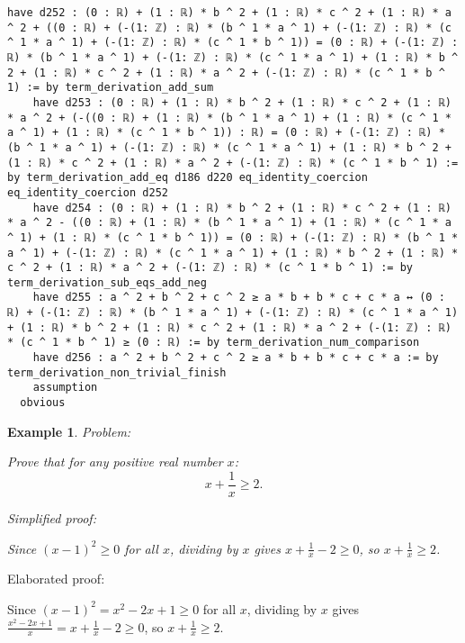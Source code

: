 \documentclass{article}
\newtheorem{example}{Example}
\begin{document}
\begin{tcolorbox}[colback=white!10, width=\linewidth]
\begin{lstlisting}[language=Lean4]
    have d252 : (0 : ℝ) + (1 : ℝ) * b ^ 2 + (1 : ℝ) * c ^ 2 + (1 : ℝ) * a ^ 2 + ((0 : ℝ) + (-(1: ℤ) : ℝ) * (b ^ 1 * a ^ 1) + (-(1: ℤ) : ℝ) * (c ^ 1 * a ^ 1) + (-(1: ℤ) : ℝ) * (c ^ 1 * b ^ 1)) = (0 : ℝ) + (-(1: ℤ) : ℝ) * (b ^ 1 * a ^ 1) + (-(1: ℤ) : ℝ) * (c ^ 1 * a ^ 1) + (1 : ℝ) * b ^ 2 + (1 : ℝ) * c ^ 2 + (1 : ℝ) * a ^ 2 + (-(1: ℤ) : ℝ) * (c ^ 1 * b ^ 1) := by term_derivation_add_sum
    have d253 : (0 : ℝ) + (1 : ℝ) * b ^ 2 + (1 : ℝ) * c ^ 2 + (1 : ℝ) * a ^ 2 + (-((0 : ℝ) + (1 : ℝ) * (b ^ 1 * a ^ 1) + (1 : ℝ) * (c ^ 1 * a ^ 1) + (1 : ℝ) * (c ^ 1 * b ^ 1)) : ℝ) = (0 : ℝ) + (-(1: ℤ) : ℝ) * (b ^ 1 * a ^ 1) + (-(1: ℤ) : ℝ) * (c ^ 1 * a ^ 1) + (1 : ℝ) * b ^ 2 + (1 : ℝ) * c ^ 2 + (1 : ℝ) * a ^ 2 + (-(1: ℤ) : ℝ) * (c ^ 1 * b ^ 1) := by term_derivation_add_eq d186 d220 eq_identity_coercion eq_identity_coercion d252
    have d254 : (0 : ℝ) + (1 : ℝ) * b ^ 2 + (1 : ℝ) * c ^ 2 + (1 : ℝ) * a ^ 2 - ((0 : ℝ) + (1 : ℝ) * (b ^ 1 * a ^ 1) + (1 : ℝ) * (c ^ 1 * a ^ 1) + (1 : ℝ) * (c ^ 1 * b ^ 1)) = (0 : ℝ) + (-(1: ℤ) : ℝ) * (b ^ 1 * a ^ 1) + (-(1: ℤ) : ℝ) * (c ^ 1 * a ^ 1) + (1 : ℝ) * b ^ 2 + (1 : ℝ) * c ^ 2 + (1 : ℝ) * a ^ 2 + (-(1: ℤ) : ℝ) * (c ^ 1 * b ^ 1) := by term_derivation_sub_eqs_add_neg
    have d255 : a ^ 2 + b ^ 2 + c ^ 2 ≥ a * b + b * c + c * a ↔ (0 : ℝ) + (-(1: ℤ) : ℝ) * (b ^ 1 * a ^ 1) + (-(1: ℤ) : ℝ) * (c ^ 1 * a ^ 1) + (1 : ℝ) * b ^ 2 + (1 : ℝ) * c ^ 2 + (1 : ℝ) * a ^ 2 + (-(1: ℤ) : ℝ) * (c ^ 1 * b ^ 1) ≥ (0 : ℝ) := by term_derivation_num_comparison
    have d256 : a ^ 2 + b ^ 2 + c ^ 2 ≥ a * b + b * c + c * a := by term_derivation_non_trivial_finish
    assumption
  obvious

\end{lstlisting}
\end{tcolorbox}


\begin{example}
Problem:
\begin{tcolorbox}[colback=yellow!10, width=\linewidth]
Prove that for any positive real number $x$:
    $$x + \frac{1}{x} \geq 2.$$
\end{tcolorbox}

Simplified proof:
\begin{tcolorbox}[colback=blue!10, width=\linewidth]
Since $(x-1)^2 \ge 0$ for all $x$, dividing by $x$ gives $x + \frac{1}{x} - 2 \ge 0$, so $x + \frac{1}{x} \ge 2$.
\end{tcolorbox}
\end{example}

Elaborated proof:
\begin{tcolorbox}[colback=green!10, width=\linewidth]
Since $(x-1)^2 = x^2 - 2x + 1 \ge 0$ for all $x$, dividing by $x$ gives $\frac{x^2 - 2x + 1}{x} = x + \frac{1}{x} - 2 \ge 0$, so $x + \frac{1}{x} \ge 2$.
\end{tcolorbox}
\end{document}
